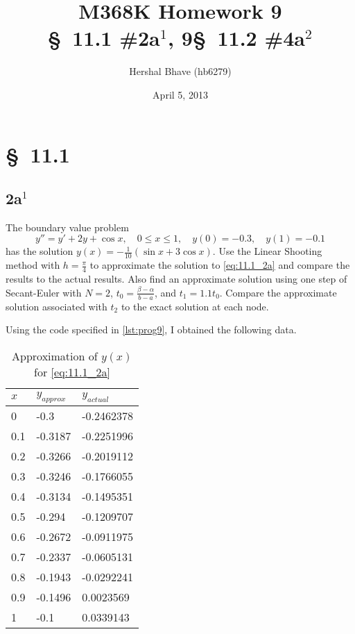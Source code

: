\documentclass[12pt]{article}
\title{M368K Homework 9 \\
  \normalsize{\S~11.1 \#2a$^1$, 9\quad \S~11.2 \#4a$^2$}}
\author{Hershal Bhave (hb6279)}
\date{April 5, 2013}
\begin{document}
\maketitle

\section{\S~11.1}
\subsection{2a$^1$}
The boundary value problem 
\begin{equation}
  \label{eq:11.1_2a}
  y''=y'+2y+\cos x,\quad 0\leq x \leq 1,\quad y(0)=-0.3,\quad y(1)=-0.1
\end{equation}
has the solution $y(x)=-\frac{1}{10}(\sin x + 3\cos x)$. Use the
Linear Shooting method with $h=\frac{\pi}{4}$ to approximate the
solution to \cref{eq:11.1_2a} and compare the results to the actual
results. Also find an approximate solution using one step of
Secant-Euler with
$N=2$, $t_0=\frac{\beta-\alpha}{b-a}$, and $t_1=1.1t_0$. Compare the
approximate solution associated with $t_2$ to the exact solution at
each node.

Using the code specified in \cref{lst:prog9}, I obtained the following
data.

\begin{table}[h]
  \centering
  \begin{tabularx}{.5\textwidth}{XXX}
    \hline
    $x$ & $y_{approx}$ & $y_{actual}$ \\
    \hline
    0 &    -0.3 &     -0.2462378 \\
    0.1 & -0.3187 &   -0.2251996 \\  
    0.2 & -0.3266 &   -0.2019112 \\  
    0.3 & -0.3246 &   -0.1766055 \\  
    0.4 & -0.3134 &   -0.1495351 \\  
    0.5 &  -0.294 &   -0.1209707 \\  
    0.6 & -0.2672 &   -0.0911975 \\  
    0.7 & -0.2337 &   -0.0605131 \\  
    0.8 & -0.1943 &   -0.0292241 \\  
    0.9 & -0.1496 &    0.0023569 \\  
    1 &    -0.1 &      0.0339143 \\
    \hline           
  \end{tabularx}
  \caption{Approximation of $y(x)$ for \cref{eq:11.1_2a}}
  \label{tab:2a_data}
\end{table}
\end{document}
